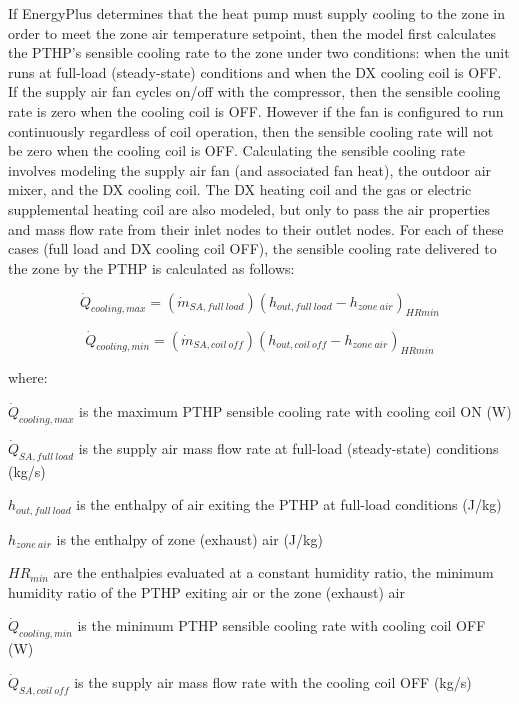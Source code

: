 If EnergyPlus determines that the heat pump must supply cooling to the zone in order to meet the zone air temperature setpoint, then the model first calculates the PTHP's sensible cooling rate to the zone under two conditions: when the unit runs at full-load (steady-state) conditions and when the DX cooling coil is OFF. If the supply air fan cycles on/off with the compressor, then the sensible cooling rate is zero when the cooling coil is OFF. However if the fan is configured to run continuously regardless of coil operation, then the sensible cooling rate will not be zero when the cooling coil is OFF. Calculating the sensible cooling rate involves modeling the supply air fan (and associated fan heat), the outdoor air mixer, and the DX cooling coil. The DX heating coil and the gas or electric supplemental heating coil are also modeled, but only to pass the air properties and mass flow rate from their inlet nodes to their outlet nodes. For each of these cases (full load and DX cooling coil OFF), the sensible cooling rate delivered to the zone by the PTHP is calculated as follows:

\begin{equation}
  \dot{Q}_{cooling,max} = \left( \dot{m}_{SA,full~load} \right) \left( h_{out,full~load} - h_{zone~air} \right)_{HRmin}
\end{equation}

\begin{equation}
  \dot{Q}_{cooling,min} = \left( \dot{m}_{SA,coil~off} \right) \left( h_{out,coil~off} - h_{zone~air} \right)_{HRmin}
\end{equation}

where:

\(\dot{Q}_{cooling,max}\) is the maximum PTHP sensible cooling rate with cooling coil ON (W)

\(\dot{Q}_{SA,full~load}\) is the supply air mass flow rate at full-load (steady-state) conditions (kg/s)

\(h_{out,full~load}\) is the enthalpy of air exiting the PTHP at full-load conditions (J/kg)

\(h_{zone~air}\) is the enthalpy of zone (exhaust) air (J/kg)

\(HR_{min}\) are the enthalpies evaluated at a constant humidity ratio, the minimum humidity ratio of the PTHP exiting air or the zone (exhaust) air

\(\dot{Q}_{cooling,min}\) is the minimum PTHP sensible cooling rate with cooling coil OFF (W)

\(\dot{Q}_{SA,coil~off}\) is the supply air mass flow rate with the cooling coil OFF (kg/s)

